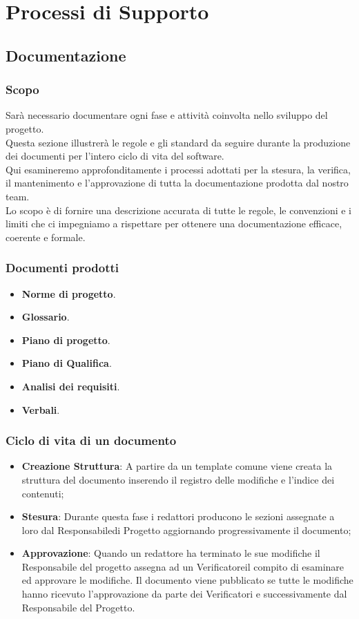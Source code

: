 \section{Processi di Supporto}\label{sup}

\subsection{Documentazione}
\subsubsection{Scopo}
Sarà necessario documentare ogni fase e attività coinvolta nello sviluppo del progetto.\\
Questa sezione illustrerà le regole e gli standard da seguire durante la produzione 
dei documenti per l'intero ciclo di vita del software. \\
Qui esamineremo approfonditamente i processi adottati per la stesura, la verifica\glo, il mantenimento e l’approvazione di tutta la documentazione prodotta dal nostro team. \\
Lo scopo è di fornire una descrizione accurata di tutte le regole, le convenzioni e i limiti che ci impegniamo a rispettare per ottenere una documentazione efficace, coerente e formale.\\

\subsubsection{Documenti prodotti}
\begin{itemize}
    \item \textbf{Norme di progetto}.
    \item \textbf{Glossario}.
    \item \textbf{Piano di progetto}.
    \item \textbf{Piano di Qualifica}.
    \item \textbf{Analisi dei requisiti}.
    \item \textbf{Verbali}.
\end{itemize}

\subsubsection{Ciclo di vita di un documento}
\begin{itemize}
    \item \textbf{Creazione Struttura}: A partire da un template comune viene creata la struttura del documento inserendo il registro delle modifiche e l’indice dei contenuti;
    \item \textbf{Stesura}: Durante questa fase i redattori producono le sezioni assegnate a loro dal Responsabile\glo di Progetto aggiornando progressivamente il documento;
    \item \textbf{Approvazione}: Quando un redattore ha terminato le sue modifiche il Responsabile del progetto assegna ad un Verificatore\glo il compito di esaminare ed approvare le modifiche.
Il documento viene pubblicato se tutte le modifiche hanno ricevuto l’approvazione da parte dei Verificatori e successivamente dal Responsabile del Progetto.
\end{itemize}

